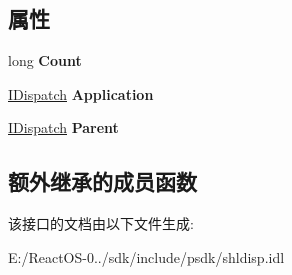 \subsection*{属性}
\begin{DoxyCompactItemize}
\item 
\mbox{\label{interface_shell32_1_1_folder_items_a809ee7e50a1760ef5a1fef114aedfbb2}} 
long {\bfseries Count}
\item 
\mbox{\label{interface_shell32_1_1_folder_items_a20b79676a0b86ef68f332fea77a179bd}} 
\hyperlink{interface_i_dispatch}{I\+Dispatch} {\bfseries Application}
\item 
\mbox{\label{interface_shell32_1_1_folder_items_ac339e0b75fa2ce02bea9939a21613381}} 
\hyperlink{interface_i_dispatch}{I\+Dispatch} {\bfseries Parent}
\end{DoxyCompactItemize}
\subsection*{额外继承的成员函数}


该接口的文档由以下文件生成\+:\begin{DoxyCompactItemize}
\item 
E\+:/\+React\+O\+S-\/0../sdk/include/psdk/shldisp.\+idl\end{DoxyCompactItemize}
